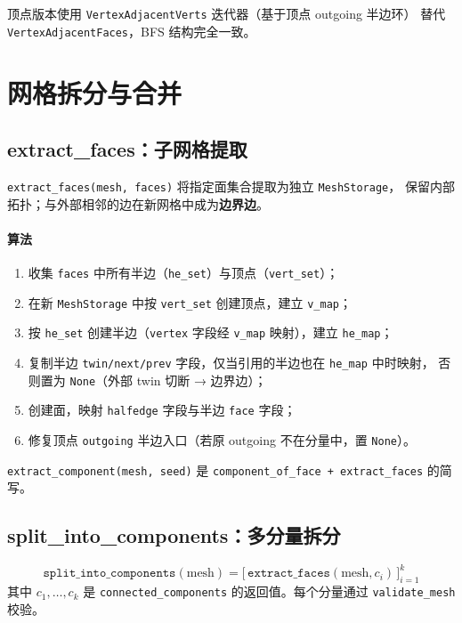\documentclass[11pt,a4paper]{article}
\begin{document}
顶点版本使用 \texttt{VertexAdjacentVerts} 迭代器（基于顶点 outgoing 半边环）
替代 \texttt{VertexAdjacentFaces}，BFS 结构完全一致。

\section{网格拆分与合并}

\subsection{extract\_faces：子网格提取}

\texttt{extract\_faces(mesh, faces)} 将指定面集合提取为独立 \texttt{MeshStorage}，
保留内部拓扑；与外部相邻的边在新网格中成为\textbf{边界边}。

\paragraph{算法}
\begin{enumerate}
  \item 收集 \texttt{faces} 中所有半边（\texttt{he\_set}）与顶点（\texttt{vert\_set}）；
  \item 在新 \texttt{MeshStorage} 中按 \texttt{vert\_set} 创建顶点，建立 \texttt{v\_map}；
  \item 按 \texttt{he\_set} 创建半边（\texttt{vertex} 字段经 \texttt{v\_map} 映射），建立 \texttt{he\_map}；
  \item 复制半边 \texttt{twin/next/prev} 字段，仅当引用的半边也在 \texttt{he\_map} 中时映射，
        否则置为 \texttt{None}（外部 twin 切断 → 边界边）；
  \item 创建面，映射 \texttt{halfedge} 字段与半边 \texttt{face} 字段；
  \item 修复顶点 \texttt{outgoing} 半边入口（若原 outgoing 不在分量中，置 \texttt{None}）。
\end{enumerate}

\texttt{extract\_component(mesh, seed)} 是 \texttt{component\_of\_face + extract\_faces}
的简写。

\subsection{split\_into\_components：多分量拆分}

\[
  \texttt{split\_into\_components}(\text{mesh}) = \bigl[\,\texttt{extract\_faces}(\text{mesh}, c_i)\,\bigr]_{i=1}^{k}
\]
其中 $c_1, \dots, c_k$ 是 \texttt{connected\_components} 的返回值。每个分量通过
\texttt{validate\_mesh} 校验。
\end{document}
